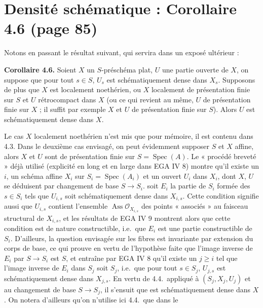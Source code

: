 \documentclass[11pt,a4paper]{article}
\begin{document}
\section*{Densité schématique : Corollaire 4.6 (page 85)}


Notons en passant le résultat suivant, qui servira dans un exposé ultérieur :

\textbf{Corollaire 4.6.} Soient $X$ un $S$-préschéma plat, $U$ une partie
ouverte de $X$, on suppose que pour tout $s \in S$, $U_{s}$ est
schématiquement dense dans $X_{s}$. Supposons de plus que $X$ est localement
noethérien, ou $X$ localement de présentation finie sur $S$ et $U$
rétrocompact dans $X$ (ou ce qui revient au même, $U$ de présentation finie
sur $X$ ; il suffit par exemple $X$ et $U$ de présentation finie sur $S$).
Alors $U$ est schématiquement dense dans $X$.

Le cas $X$ localement noethérien n'est mis que pour mémoire, il est contenu
dans 4.3. Dans le deuxième cas envisagé, on peut évidemment supposer $S$ et $X$
affine, alors $X$ et $U$ sont de présentation finie sur
$S = \operatorname{Spec}(A)$.  Le « procédé breveté » déjà
utilisé (explicité en long et en large dans EGA IV 8) montre qu'il existe un
 $i$, un schéma affine $X_{i}$ sur
$S_{i} = \operatorname{Spec}(A_{i})$ et un ouvert $U_{i}$ dans $X_{i}$, dont
$X$, $U$ se déduisent par changement de base  $S \to S_{i}$.
 soit $E_{i}$ la partie de $S_{i}$ formée
des $s \in S_{i}$ tels que $U_{i,s}$ soit schématiquement dense dans
$X_{i,s}$. Cette condition signifie aussi que $U_{i,s}$ contient l'ensemble
$\operatorname{Ass} \mathcal{O}_{X_{i,s}}$ des points « associés » au faisceau
structural de $X_{i,s}$, et les résultats de EGA IV 9 montrent alors que cette
condition est de nature constructible, i.e.\ que $E_{i}$ est une partie
constructible de $S_{i}$. D'ailleurs, la question envisagée sur les fibres est
invariante par extension du corps de base, ce qui prouve en vertu de
l'hypothèse faite que  l'image inverse de
$E_{i}$ par $S \to S_{i}$ \struck{\ill{}} est $S$, et entraîne par EGA IV 8
qu'il existe un $j \geqslant i$ tel que l'image inverse  de
$E_{i}$ dans $S_{j}$ soit $S_{j}$, i.e.\ que pour tout $s \in S_{j}$,
$U_{j,s}$ est schématiquement dense dans $X_{j,s}$. En vertu de 4.4.\ appliqué
à $(S_{j}, X_{j}, U_{j})$ et au changement de base $S \to S_{j}$, il s'ensuit
que  est schématiquement dense dans $X$. On notera d'ailleurs
qu'on n'utilise ici 4.4.\ que dans le
\end{document}
